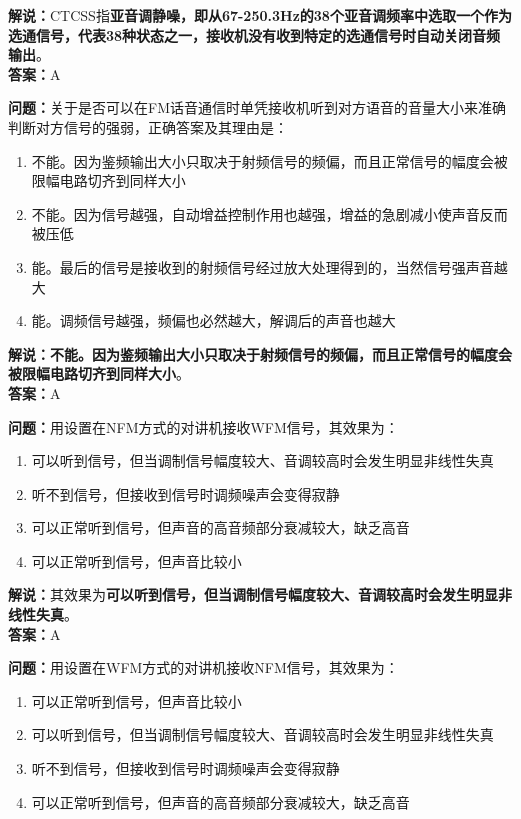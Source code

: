 \textbf{解说：}CTCSS指\textbf{亚音调静噪，即从67-250.3Hz的38个亚音调频率中选取一个作为选通信号，代表38种状态之一，接收机没有收到特定的选通信号时自动关闭音频输出}。\\\textbf{答案：}A%



\textbf{问题：}关于是否可以在FM话音通信时单凭接收机听到对方语音的音量大小来准确判断对方信号的强弱，正确答案及其理由是：

\begin{enumerate}[label=\Alph*), leftmargin=1.5cm]
	\item 不能。因为鉴频输出大小只取决于射频信号的频偏，而且正常信号的幅度会被限幅电路切齐到同样大小
	\item 不能。因为信号越强，自动增益控制作用也越强，增益的急剧减小使声音反而被压低
	\item 能。最后的信号是接收到的射频信号经过放大处理得到的，当然信号强声音越大
	\item 能。调频信号越强，频偏也必然越大，解调后的声音也越大
\end{enumerate}

\textbf{解说：不能。因为鉴频输出大小只取决于射频信号的频偏，而且正常信号的幅度会被限幅电路切齐到同样大小}。\\\textbf{答案：}A%



\textbf{问题：}用设置在NFM方式的对讲机接收WFM信号，其效果为：

\begin{enumerate}[label=\Alph*), leftmargin=1.5cm]
	\item 可以听到信号，但当调制信号幅度较大、音调较高时会发生明显非线性失真
	\item 听不到信号，但接收到信号时调频噪声会变得寂静
	\item 可以正常听到信号，但声音的高音频部分衰减较大，缺乏高音
	\item 可以正常听到信号，但声音比较小
\end{enumerate}

\textbf{解说：}其效果为\textbf{可以听到信号，但当调制信号幅度较大、音调较高时会发生明显非线性失真}。\\\textbf{答案：}A%

\textbf{问题：}用设置在WFM方式的对讲机接收NFM信号，其效果为：

\begin{enumerate}[label=\Alph*), leftmargin=1.5cm]
	\item 可以正常听到信号，但声音比较小
	\item 可以听到信号，但当调制信号幅度较大、音调较高时会发生明显非线性失真
	\item 听不到信号，但接收到信号时调频噪声会变得寂静
	\item 可以正常听到信号，但声音的高音频部分衰减较大，缺乏高音
\end{enumerate}

